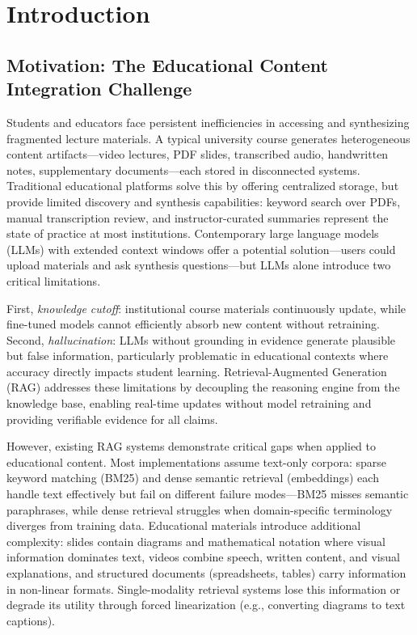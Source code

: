 \documentclass[11pt,a4paper,twocolumn]{article}
\begin{document}
\twocolumn

\section{Introduction}

\subsection{Motivation: The Educational Content Integration Challenge}

Students and educators face persistent inefficiencies in accessing and synthesizing fragmented lecture materials. A typical university course generates heterogeneous content artifacts—video lectures, PDF slides, transcribed audio, handwritten notes, supplementary documents—each stored in disconnected systems. Traditional educational platforms solve this by offering centralized storage, but provide limited discovery and synthesis capabilities: keyword search over PDFs, manual transcription review, and instructor-curated summaries represent the state of practice at most institutions. Contemporary large language models (LLMs) with extended context windows offer a potential solution—users could upload materials and ask synthesis questions—but LLMs alone introduce two critical limitations.

First, \textit{knowledge cutoff}: institutional course materials continuously update, while fine-tuned models cannot efficiently absorb new content without retraining. Second, \textit{hallucination}: LLMs without grounding in evidence generate plausible but false information, particularly problematic in educational contexts where accuracy directly impacts student learning. Retrieval-Augmented Generation (RAG) \cite{lewis2020rag} addresses these limitations by decoupling the reasoning engine from the knowledge base, enabling real-time updates without model retraining and providing verifiable evidence for all claims.

However, existing RAG systems demonstrate critical gaps when applied to educational content. Most implementations assume text-only corpora: sparse keyword matching (BM25) and dense semantic retrieval (embeddings) each handle text effectively but fail on different failure modes—BM25 misses semantic paraphrases, while dense retrieval struggles when domain-specific terminology diverges from training data. Educational materials introduce additional complexity: slides contain diagrams and mathematical notation where visual information dominates text, videos combine speech, written content, and visual explanations, and structured documents (spreadsheets, tables) carry information in non-linear formats. Single-modality retrieval systems lose this information or degrade its utility through forced linearization (e.g., converting diagrams to text captions).
\end{document}

